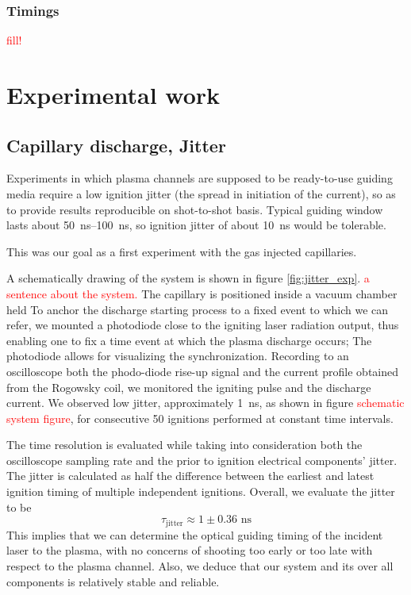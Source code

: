 \documentclass[nofonts]{tufte-book}
\begin{document}
		\subsection{Timings}
		\textcolor{red}{fill!}

		\chapter{Experimental work}\label{chap:Experimental_work}
		\section{Capillary discharge, Jitter}\label{sec:jitter}
		Experiments in which plasma channels are supposed to be ready-to-use guiding media require a low ignition jitter (the spread in initiation of the current), so as to provide results reproducible on shot-to-shot basis. Typical guiding window lasts about \SIrange{50}{100}{\ns}, so ignition jitter of about \SI{10}{ns} would be tolerable.

This was our goal as a first experiment with the gas injected capillaries.

A schematically drawing of the system is shown in figure \ref{fig:jitter_exp}. \textcolor{red}{a sentence about the system.} The capillary is positioned inside a vacuum chamber held
To anchor the discharge starting process to a fixed event to which we can refer, we mounted a photodiode close to the igniting laser radiation output, thus enabling one to fix a time event at which the plasma discharge occurs; The photodiode allows for visualizing the synchronization. Recording to an oscilloscope both the phodo-diode rise-up signal and the current profile obtained from the Rogowsky coil, we monitored the igniting pulse and the discharge current. 
We observed low jitter, approximately \SI{1}{ns}, as shown in figure \textcolor{red}{schematic system figure}, for consecutive 50 ignitions performed at constant time intervals.

The time resolution is evaluated while taking into consideration both the oscilloscope sampling rate and the prior to ignition electrical components' jitter. The jitter is calculated as half the difference between the earliest and latest ignition timing of multiple independent ignitions. Overall, we evaluate the jitter to be
\begin{equation}
	\tau_\text{jitter}\approx 1\pm 0.36 \text{ ns}
\end{equation}
This implies that we can determine the optical guiding timing of the incident laser to the plasma, with no concerns of shooting too early or too late with respect to the plasma channel. Also, we deduce that our system and its over all components is relatively stable and reliable.
\end{document}
